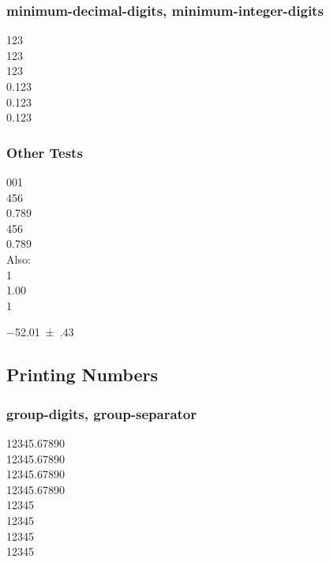 \documentclass{article}
\begin{document}
\subsubsection{minimum-decimal-digits, minimum-integer-digits}
\num{123} \\
\num[minimum-integer-digits = 2]{123} \\
\num[minimum-integer-digits = 4]{123} \\
\num{0.123} \\
\num[minimum-decimal-digits = 2]{0.123} \\
\num[minimum-decimal-digits = 4]{0.123}

\subsubsection{Other Tests}
{
\num{001} \\
\num{456} \\
\num{.789} \\
%
\num{456} \\
\num{.789} \\
}
Also: \\
\num[minimum-decimal-digits=2]{1} \\
\num[minimum-decimal-digits=1, drop-zero-decimal]{1.00} \\
\num[minimum-decimal-digits=2, drop-zero-decimal]{1}

\num[separate-uncertainty=true, round-mode=uncertainty, drop-zero-decimal=true, round-precision=1]{-52.01(43)}


\subsection{Printing Numbers}
\subsubsection{group-digits, group-separator}
\num{12345.67890} \\
\num[group-digits = none]{12345.67890} \\
\num[group-digits = decimal]{12345.67890} \\
\num[group-digits = integer]{12345.67890}\\
\num{12345} \\
\num[group-separator = {,}]{12345} \\
\num[group-separator = \text{~}]{12345}\\
\num[group-separator = \ ]{12345}
\end{document}
